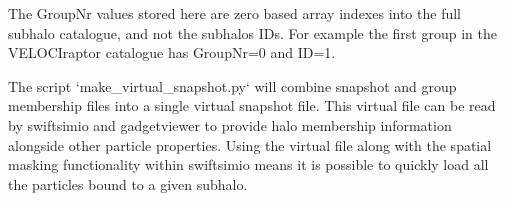 \documentclass{article}
\begin{document}
The GroupNr values stored here are zero based array indexes into the
full subhalo catalogue, and not the subhalos IDs. For example the first group
in the VELOCIraptor catalogue has GroupNr=0 and ID=1.

The script `make_virtual_snapshot.py` will combine snapshot and group membership files 
into a single virtual snapshot file. This virtual file can be read by swiftsimio and 
gadgetviewer to provide halo membership information alongside other particle properties.
Using the virtual file along with the spatial masking functionality within swiftsimio
means it is possible to quickly load all the particles bound to a given subhalo.
\end{document}
